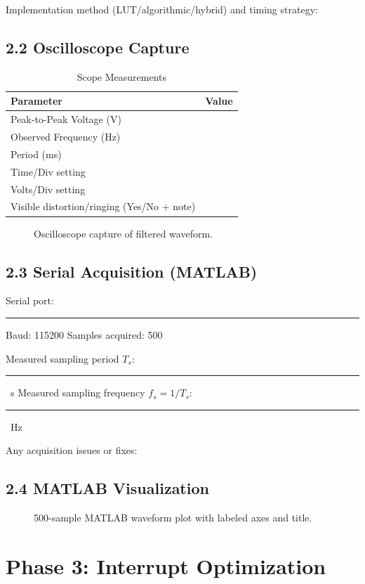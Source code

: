 \documentclass[11pt,letterpaper]{article}
\newcommand{\shortblank}{\rule{1.2in}{0.4pt}}
\newcommand{\answerbox}[1]{\fbox{\parbox[c][#1][t]{\linewidth}{}}}
\begin{document}
Implementation method (LUT/algorithmic/hybrid) and timing strategy:
\answerbox{1.0in}

\subsection*{2.2 Oscilloscope Capture}
\begin{table}[H]
\centering
\caption{Scope Measurements}
\begin{tabular}{@{}lc@{}}
\toprule
Parameter & Value \\
\midrule
Peak-to-Peak Voltage (V) & \\
Observed Frequency (Hz) & \\
Period (ms) & \\
Time/Div setting & \\
Volts/Div setting & \\
Visible distortion/ringing (Yes/No + note) & \\
\bottomrule
\end{tabular}
\end{table}

\begin{figure}[H]
    \centering
    \caption{Oscilloscope capture of filtered waveform.}
\end{figure}

\subsection*{2.3 Serial Acquisition (MATLAB)}
Serial port: \shortblank \hfill Baud: 115200 \hfill Samples acquired: 500

Measured sampling period $T_s$: \shortblank\ s \hfill Measured sampling frequency $f_s = 1/T_s$: \shortblank\ Hz

Any acquisition issues or fixes:
\answerbox{0.8in}

\subsection*{2.4 MATLAB Visualization}
\begin{figure}[H]
    \centering
    \caption{500-sample MATLAB waveform plot with labeled axes and title.}
\end{figure}

\section{Phase 3: Interrupt Optimization}
\end{document}
